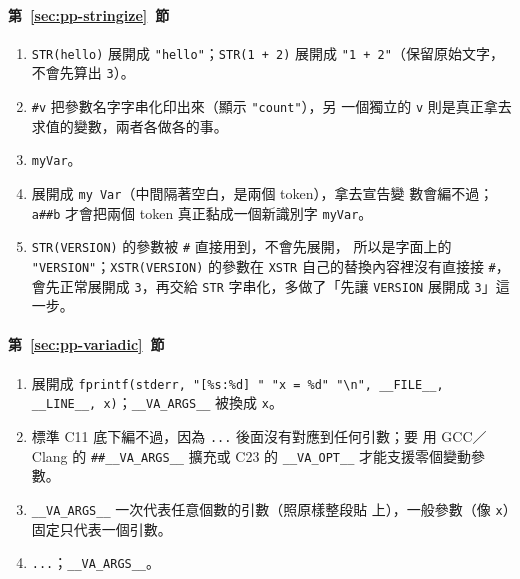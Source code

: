 \paragraph{第~\ref{sec:pp-stringize}~節}
\begin{enumerate}
\item \texttt{STR(hello)} 展開成 \texttt{"hello"}；\texttt{STR(1 + 2)}
展開成 \texttt{"1 + 2"}（保留原始文字，不會先算出 \texttt{3}）。
\item \texttt{\#v} 把參數名字字串化印出來（顯示 \texttt{"count"}），另
一個獨立的 \texttt{v} 則是真正拿去求值的變數，兩者各做各的事。
\item \texttt{myVar}。
\item 展開成 \texttt{my Var}（中間隔著空白，是兩個 token），拿去宣告變
數會編不過；\texttt{a\#\#b} 才會把兩個 token 真正黏成一個新識別字
\texttt{myVar}。
\item \texttt{STR(VERSION)} 的參數被 \texttt{\#} 直接用到，不會先展開，
所以是字面上的 \texttt{"VERSION"}；\texttt{XSTR(VERSION)} 的參數在
\texttt{XSTR} 自己的替換內容裡沒有直接接 \texttt{\#}，會先正常展開成
\texttt{3}，再交給 \texttt{STR} 字串化，多做了「先讓 \texttt{VERSION}
展開成 \texttt{3}」這一步。
\end{enumerate}

\paragraph{第~\ref{sec:pp-variadic}~節}
\begin{enumerate}
\item 展開成 \texttt{fprintf(stderr, "[\%s:\%d] " "x = \%d" "\textbackslash n",
\_\_FILE\_\_, \_\_LINE\_\_, x)}；\texttt{\_\_VA\_ARGS\_\_} 被換成
\texttt{x}。
\item 標準 C11 底下編不過，因為 \texttt{...} 後面沒有對應到任何引數；要
用 GCC／Clang 的 \texttt{\#\#\_\_VA\_ARGS\_\_} 擴充或 C23 的
\texttt{\_\_VA\_OPT\_\_} 才能支援零個變動參數。
\item \texttt{\_\_VA\_ARGS\_\_} 一次代表任意個數的引數（照原樣整段貼
上），一般參數（像 \texttt{x}）固定只代表一個引數。
\item \texttt{...}；\texttt{\_\_VA\_ARGS\_\_}。
\end{enumerate}

